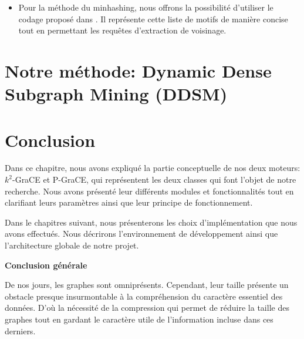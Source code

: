 \documentclass[a4paper,oneside,12pt]{report}
\theoremstyle{definition}
\begin{document}
\begin{itemize}
\item Pour la méthode du minhashing, nous offrons  la possibilité d'utiliser le codage proposé dans \citep{liu2018reducing}. Il représente cette liste de motifs de manière concise tout en permettant les requêtes d'extraction de voisinage. %
\end{itemize}

		
		
		
	\section{Notre méthode: Dynamic Dense Subgraph Mining (DDSM)}
		
	
	\section{Conclusion}

Dans ce chapitre, nous avons expliqué la partie conceptuelle de nos deux moteurs: $k^2$-GraCE et P-GraCE, qui  représentent les deux classes qui font l'objet de notre recherche. Nous avons présenté leur différents modules et fonctionnalités tout en clarifiant leurs paramètres ainsi que leur principe de fonctionnement.

	Dans le chapitres suivant, nous présenterons les choix d'implémentation que nous avons effectués. Nous décrirons l'environnement de développement ainsi que l'architecture globale de notre projet. 
	
	
	

	


	
	




\newpage
\Huge{ 
			\textbf {Conclusion générale}} \\[0.5in]
			\normalsize
De nos jours, les graphes sont omniprésents. Cependant, leur taille présente un obstacle presque insurmontable à la compréhension du caractère essentiel des données. D'où la nécessité de la compression qui permet de réduire la taille des graphes tout en gardant le caractère utile de l'information incluse dans ces derniers.\\
\end{document}
